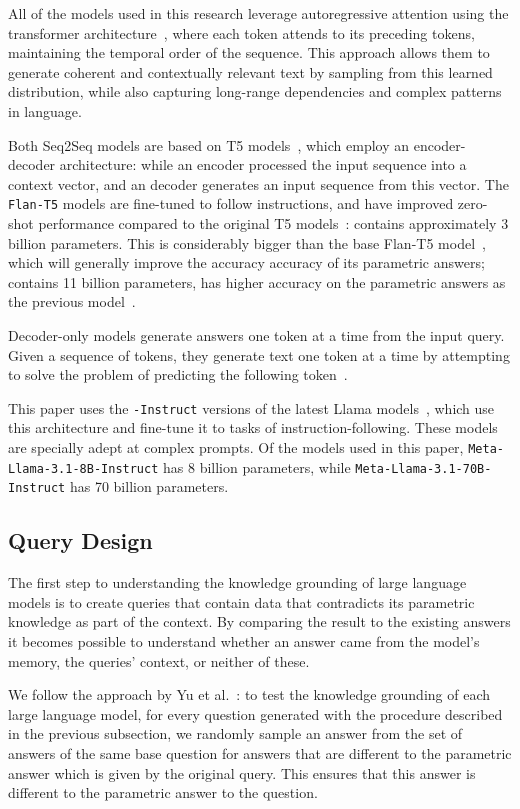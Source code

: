 All of the models used in this research leverage autoregressive attention using the transformer architecture~\cite{attention_is_all_you_need}, where each token attends to its preceding tokens, maintaining the temporal order of the sequence.
This approach allows them to generate coherent and contextually relevant text by sampling from this learned distribution, while also capturing long-range dependencies and complex patterns in language.

Both Seq2Seq models are based on T5 models~\cite{t5}, which employ an encoder-decoder architecture: while an encoder processed the input sequence into a context vector, and an decoder generates an input sequence from this vector.
The \texttt{Flan-T5} models are fine-tuned to follow instructions, and have improved zero-shot performance compared to the original T5 models~\cite{flant5}:
\smallflan{} contains approximately 3 billion parameters.
This is considerably bigger than the base Flan-T5 model~\cite{flant5}, which will generally improve the accuracy accuracy of its parametric answers; \bigflan{} contains 11 billion parameters, has higher accuracy on the parametric answers as the previous model~\cite{flant5}.

Decoder-only models generate answers one token at a time from the input query.
Given a sequence of tokens, they generate text one token at a time by attempting to solve the problem of predicting the following token~\cite{gpt}.

This paper uses the \texttt{-Instruct} versions of the latest Llama models~\cite{llama3}, which use this architecture and fine-tune it to tasks of instruction-following.
These models are specially adept at complex prompts.
Of the models used in this paper, \texttt{Meta-Llama-3.1-8B-Instruct} has 8 billion parameters, while \texttt{Meta-Llama-3.1-70B-Instruct} has 70 billion parameters.

\subsection{Query Design}
\label{query_design}

The first step to understanding the knowledge grounding of large language models is to create queries that contain data that contradicts its parametric knowledge as part of the context.
By comparing the result to the existing answers it becomes possible to understand whether an answer came from the model's memory, the queries' context, or neither of these.

We follow the approach by Yu et al.~\cite{factual_recall}: to test the knowledge grounding of each large language model, for every question generated with the procedure described in the previous subsection, we randomly sample an answer from the set of answers of the same base question for answers that are different to the parametric answer which is given by the original query.
This ensures that this answer is different to the parametric answer to the question.

